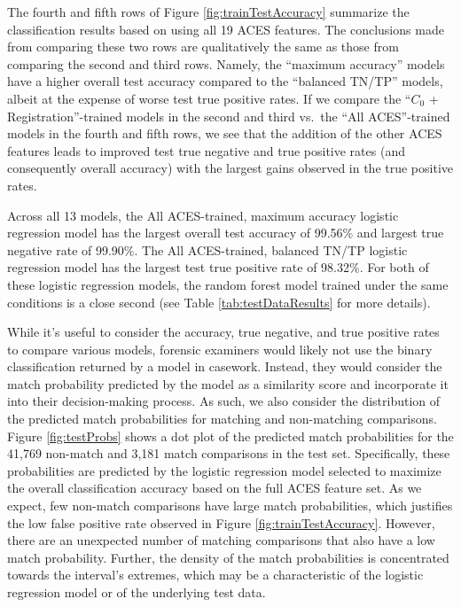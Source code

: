 \documentclass[11pt,]{isuthesis}
\begin{document}
The fourth and fifth rows of Figure \ref{fig:trainTestAccuracy} summarize the classification results based on using all 19 ACES features.
The conclusions made from comparing these two rows are qualitatively the same as those from comparing the second and third rows.
Namely, the ``maximum accuracy'' models have a higher overall test accuracy compared to the ``balanced TN/TP'' models, albeit at the expense of worse test true positive rates.
If we compare the ``\(C_0\) + Registration''-trained models in the second and third vs.~the ``All ACES''-trained models in the fourth and fifth rows, we see that the addition of the other ACES features leads to improved test true negative and true positive rates (and consequently overall accuracy) with the largest gains observed in the true positive rates.

Across all 13 models, the All ACES-trained, maximum accuracy logistic regression model has the largest overall test accuracy of 99.56\% and largest true negative rate of 99.90\%.
The All ACES-trained, balanced TN/TP logistic regression model has the largest test true positive rate of 98.32\%.
For both of these logistic regression models, the random forest model trained under the same conditions is a close second (see Table \ref{tab:testDataResults} for more details).

While it's useful to consider the accuracy, true negative, and true positive rates to compare various models, forensic examiners would likely not use the binary classification returned by a model in casework.
Instead, they would consider the match probability predicted by the model as a similarity score and incorporate it into their decision-making process.
As such, we also consider the distribution of the predicted match probabilities for matching and non-matching comparisons.
Figure \ref{fig:testProbs} shows a dot plot of the predicted match probabilities for the 41,769 non-match and 3,181 match comparisons in the test set.
Specifically, these probabilities are predicted by the logistic regression model selected to maximize the overall classification accuracy based on the full ACES feature set.
As we expect, few non-match comparisons have large match probabilities, which justifies the low false positive rate observed in Figure \ref{fig:trainTestAccuracy}.
However, there are an unexpected number of matching comparisons that also have a low match probability.
Further, the density of the match probabilities is concentrated towards the interval's extremes, which may be a characteristic of the logistic regression model or of the underlying test data.
\end{document}

